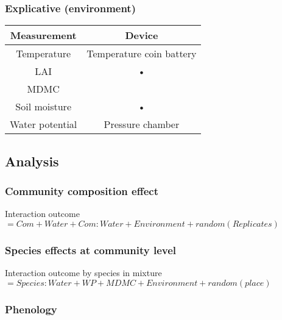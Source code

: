 \documentclass[12pt]{article} %
\begin{document}
\subsubsection{Explicative (environment)}
\begin{tabular}{cc}
Measurement & Device \\ 
\hline
Temperature & Temperature coin battery \\ 
LAI & • \\ 
MDMC &  \\ 
Soil moisture & • \\ 
Water potential & Pressure chamber \\ 
\hline 
\end{tabular} 

\subsection{Analysis}

\subsubsection{Community composition effect}

Interaction outcome $= Com + Water + Com:Water + Environment + random(Replicates) $
\subsubsection{Species effects at community level}
Interaction outcome by species in mixture$ = Species:Water + WP + MDMC + Environment + random(place)$

\subsubsection{Phenology}




\end{document}
